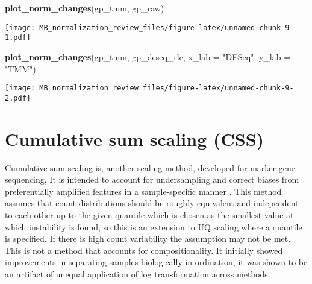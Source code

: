 \documentclass[
]{book}
\newenvironment{Shaded}{\begin{snugshade}}{\end{snugshade}}
\newcommand{\DataTypeTok}[1]{\textcolor[rgb]{0.13,0.29,0.53}{#1}}
\newcommand{\KeywordTok}[1]{\textcolor[rgb]{0.13,0.29,0.53}{\textbf{#1}}}
\newcommand{\NormalTok}[1]{#1}
\newcommand{\StringTok}[1]{\textcolor[rgb]{0.31,0.60,0.02}{#1}}
\begin{document}
\begin{Shaded}
\begin{Highlighting}[]
\KeywordTok{plot\_norm\_changes}\NormalTok{(gp\_tmm, gp\_raw)}
\end{Highlighting}
\end{Shaded}

\texttt{[image: MB\_normalization\_review\_files/figure-latex/unnamed-chunk-9-1.pdf]}

\begin{Shaded}
\begin{Highlighting}[]
\KeywordTok{plot\_norm\_changes}\NormalTok{(gp\_tmm, gp\_deseq\_rle, }\DataTypeTok{x\_lab =} \StringTok{"DESeq"}\NormalTok{, }\DataTypeTok{y\_lab =} \StringTok{"TMM"}\NormalTok{)}
\end{Highlighting}
\end{Shaded}

\texttt{[image: MB\_normalization\_review\_files/figure-latex/unnamed-chunk-9-2.pdf]}

\hypertarget{cumulative-sum-scaling-css}{%
\chapter{Cumulative sum scaling (CSS)}\label{cumulative-sum-scaling-css}}

Cumulative sum scaling is, another scaling method, developed for marker gene sequencing, It is intended to account for undersampling and correct biases from preferentially amplified features in a sample-specific manner \citep{paulson2013}. This method assumes that count distributions should be roughly equivalent and independent to each other up to the given quantile which is chosen as the smallest value at which instability is found, so this is an extension to UQ scaling where a quantile is specified. If there is high count variability the assumption may not be met. This is not a method that accounts for compositionality. It initially showed improvements in separating samples biologically in ordination, it was shown to be an artifact of unequal application of log transformation across methods \citep{costea2014}.
\end{document}
